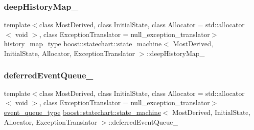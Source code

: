 \mbox{\label{classboost_1_1statechart_1_1state__machine_aeb7e89e544766bf849f78a0b0d2927b6}} 
\subsubsection{\texorpdfstring{deep\+History\+Map\+\_\+}{deepHistoryMap\_}}
{\footnotesize\ttfamily template$<$class Most\+Derived, class Initial\+State, class Allocator = std\+::allocator$<$ void $>$, class Exception\+Translator = null\+\_\+exception\+\_\+translator$>$ \\
\mbox{\hyperlink{classboost_1_1statechart_1_1state__machine_a9b8fdd7b5af3b0c9143f9d6fb4036ff7}{history\+\_\+map\+\_\+type}} \mbox{\hyperlink{classboost_1_1statechart_1_1state__machine}{boost\+::statechart\+::state\+\_\+machine}}$<$ Most\+Derived, Initial\+State, Allocator, Exception\+Translator $>$\+::deep\+History\+Map\+\_\+\hspace{0.3cm}{\ttfamily [private]}}

\mbox{\label{classboost_1_1statechart_1_1state__machine_a86145bf7f1229a0f481348a61a3bc3c4}} 
\subsubsection{\texorpdfstring{deferred\+Event\+Queue\+\_\+}{deferredEventQueue\_}}
{\footnotesize\ttfamily template$<$class Most\+Derived, class Initial\+State, class Allocator = std\+::allocator$<$ void $>$, class Exception\+Translator = null\+\_\+exception\+\_\+translator$>$ \\
\mbox{\hyperlink{classboost_1_1statechart_1_1state__machine_a308a12082f9cd10b95118871f01e94da}{event\+\_\+queue\+\_\+type}} \mbox{\hyperlink{classboost_1_1statechart_1_1state__machine}{boost\+::statechart\+::state\+\_\+machine}}$<$ Most\+Derived, Initial\+State, Allocator, Exception\+Translator $>$\+::deferred\+Event\+Queue\+\_\+\hspace{0.3cm}{\ttfamily [private]}}

